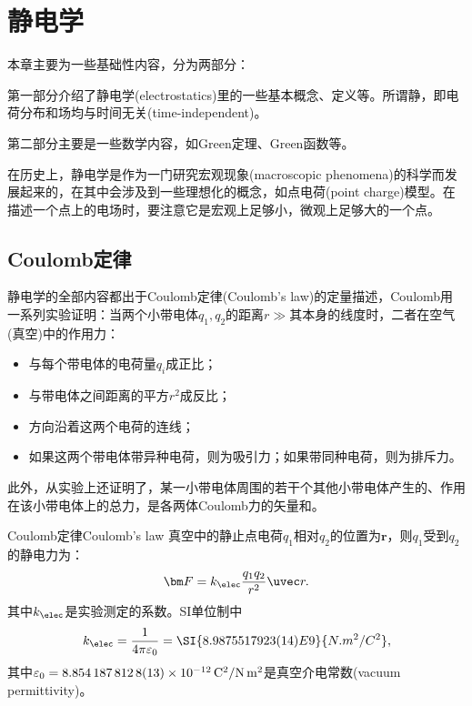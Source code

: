 \chapter{静电学}
\label{chap:electrostatics}

本章主要为一些基础性内容，分为两部分：
\begin{compactenum}
    \item 第一部分介绍了静电学(electrostatics)里的一些基本概念、定义等。所谓静，即电荷分布和场均与时间无关(time-independent)。
    \item 第二部分主要是一些数学内容，如Green定理、Green函数等。
\end{compactenum}
在历史上，静电学是作为一门研究宏观现象(macroscopic phenomena)的科学而发展起来的，在其中会涉及到一些理想化的概念，如点电荷(point charge)模型。在描述一个点上的电场时，要注意它是宏观上足够小，微观上足够大的一个点。

\section{Coulomb定律}

静电学的全部内容都出于Coulomb定律(Coulomb's law)的定量描述，Coulomb用一系列实验证明：当两个小带电体$q_1,q_2$的距离$r\gg$其本身的线度时，二者在空气(真空)中的作用力：
\begin{itemize}
    \item 与每个带电体的电荷量$q_i$成正比；
    \item 与带电体之间距离的平方$r^2$成反比；
    \item 方向沿着这两个电荷的连线；
    \item 如果这两个带电体带异种电荷，则为吸引力；如果带同种电荷，则为排斥力。
\end{itemize}
此外，从实验上还证明了，某一小带电体周围的若干个其他小带电体产生的、作用在该小带电体上的总力，是各两体Coulomb力的矢量和。

\begin{theorem}{Coulomb定律}{Coulomb's law}
    真空中的静止点电荷$q_1$相对$q_2$的位置为$\bm r$，则$q_1$受到$q_2$的静电力为：
    \begin{equation}
        \label{eqn:Coulomb law}
        \bm F=k_\elec\frac{q_1q_2}{r^2}\uvec r.
    \end{equation}
    其中$k_\elec$是实验测定的系数。SI单位制中
    \[
        k_\elec=\frac1{4\pi\varepsilon_0}=\SI{8.9875517923(14)E9}{N.m^2/C^2},
    \]
    其中$\varepsilon_0=\SI{8.8541878128(13)E-12}{C^2/N.m^2}$是真空介电常数(vacuum permittivity)。
\end{theorem}

